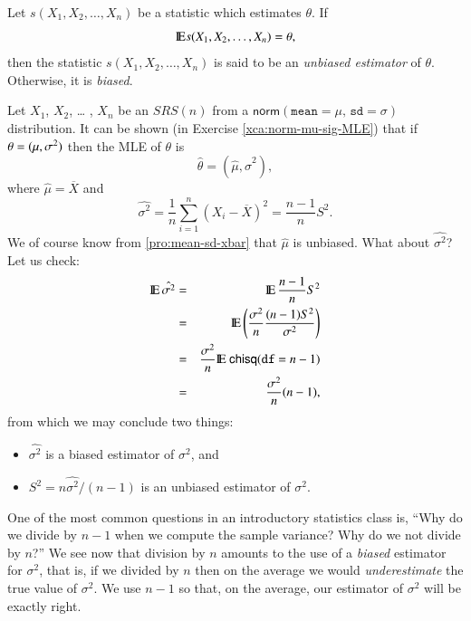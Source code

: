 \documentclass[captions=tableheading]{scrbook}
\begin{document}
\begin{defn}
Let \(s(X_{1},X_{2},\ldots,X_{n})\) be a statistic which estimates \(\theta\). If 
\[
\mathrm{I\hspace{-1.5pt}E} s(X_{1},X_{2},\ldots,X_{n})=\theta,
\]
then the statistic \(s(X_{1},X_{2},\ldots,X_{n})\) is said to be an \emph{unbiased estimator} of \(\theta\). Otherwise, it is \emph{biased}.
\end{defn}

\begin{example}
\label{exa:normal-MLE-both}

Let \(X_{1}\), \(X_{2}\), \ldots{} , \(X_{n}\) be an \(SRS(n)\) from a \(\mathsf{norm}(\mathtt{mean}=\mu,\,\mathtt{sd}=\sigma)\) distribution. It can be shown (in Exercise \ref{xca:norm-mu-sig-MLE}) that if \(\mbox{\ensuremath{\theta}}=(\mu,\sigma^{2})\) then the MLE of \(\theta\) is
\begin{equation}
\hat{\theta}=(\hat{\mu},\hat{\sigma}^{2}),
\end{equation}
where \(\hat{\mu}=\overline{X}\) and
\begin{equation}
\hat{\sigma^{2}}=\frac{1}{n}\sum_{i=1}^{n}\left(X_{i}-\overline{X}\right)^{2}=\frac{n-1}{n}S^{2}.
\end{equation}
We of course know from \ref{pro:mean-sd-xbar} that \(\hat{\mu}\) is unbiased. What about \(\hat{\sigma^{2}}\)? Let us check: 
\begin{eqnarray*}
\mathrm{I\hspace{-1.5pt}E}\,\hat{\sigma^{2}} & = & \mathrm{I\hspace{-1.5pt}E}\,\frac{n-1}{n}S^{2}\\
 & = & \mathrm{I\hspace{-1.5pt}E}\left(\frac{\sigma^{2}}{n}\frac{(n-1)S^{2}}{\sigma^{2}}\right)\\
 & = & \frac{\sigma^{2}}{n}\mathrm{I\hspace{-1.5pt}E}\ \mathsf{chisq}(\mathtt{df}=n-1)\\
 & = & \frac{\sigma^{2}}{n}(n-1),
\end{eqnarray*}
from which we may conclude two things:
\begin{itemize}
\item \(\hat{\sigma^{2}}\) is a biased estimator of \(\sigma^{2}\), and
\item \(S^{2}=n\hat{\sigma^{2}}/(n-1)\) is an unbiased estimator of \(\sigma^{2}\).
\end{itemize}

\end{example}

One of the most common questions in an introductory statistics class is, ``Why do we divide by \(n-1\) when we compute the sample variance? Why do we not divide by \(n\)?'' We see now that division by \(n\) amounts to the use of a \emph{biased} estimator for \(\sigma^{2}\), that is, if we divided by \(n\) then on the average we would \emph{underestimate} the true value of \(\sigma^{2}\). We use \(n-1\) so that, on the average, our estimator of \(\sigma^{2}\) will be exactly right. 
\end{document}
